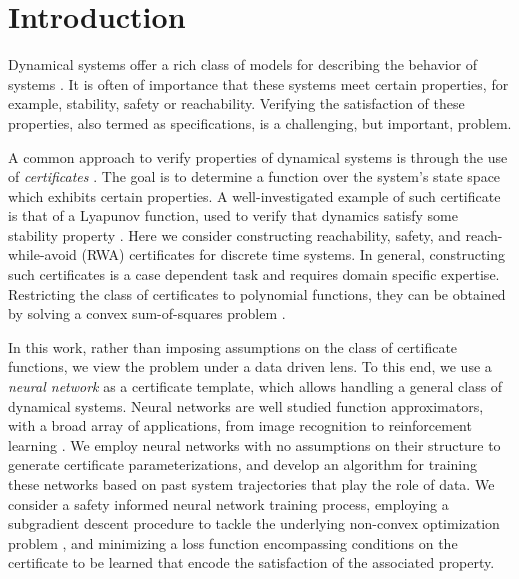\section{Introduction}
\let\thefootnote\relax{}

Dynamical systems offer a rich class of models for describing the behavior of systems \cite{Hirsch2003DifferentialED}. 
It is often of importance that these systems meet certain properties, for example, stability, safety or reachability\cite{DBLP:conf/hybrid/EdwardsPA24,DBLP:journals/tac/JagtapSZ21,DBLP:journals/tac/NejatiLJSZ23,DBLP:journals/tac/PrajnaJP07}.
Verifying the satisfaction of these properties, also termed as specifications, is a challenging, but important, problem.

A common approach to verify properties of dynamical systems is through the use of \emph{certificates} \cite{DBLP:conf/eucc/AmesCENST19,DBLP:conf/hybrid/PrajnaJ04}.
The goal is to determine a function over the system's state space which exhibits certain properties.
A well-investigated example of such certificate is that of a Lyapunov function, used to verify that dynamics satisfy some stability property \cite{Lyapunov1994TheGP}. Here
we consider constructing reachability, safety, and reach-while-avoid (RWA) certificates for discrete time systems.
In general, constructing such certificates is a case dependent task and requires domain specific expertise. 
Restricting the class of certificates to polynomial functions, 
they can be obtained by solving a convex sum-of-squares problem \cite{DBLP:journals/corr/PapachristodoulouAVPSP13,DBLP:conf/cdc/Papachristodoulou02}.

In this work, rather than imposing assumptions on the class of certificate functions, we view the problem under a data driven lens. To this end, we use a \emph{neural network} as a certificate template, which allows handling a general class of dynamical systems. 
Neural networks are well studied function approximators, with a broad array of applications, from image recognition \cite{DBLP:journals/corr/SimonyanZ14a} to reinforcement learning \cite{DBLP:journals/ral/CaiHXAK21}.
We employ neural networks with no assumptions on their structure to generate certificate parameterizations, and develop an algorithm for training these networks based on past system trajectories that play the role of data. 
We consider a safety informed neural network training process, employing a subgradient descent procedure to tackle the underlying non-convex optimization problem \cite{DBLP:books/cu/BV2014}, and minimizing a loss function encompassing conditions on the certificate to be learned that encode the satisfaction of the associated property.


